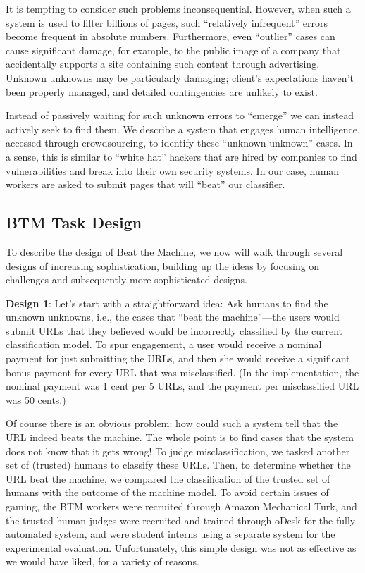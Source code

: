 
It is tempting to consider such problems inconsequential. However, when such a system is used to filter billions of pages, such ``relatively infrequent'' errors become frequent in absolute numbers. Furthermore, even ``outlier'' cases can cause significant damage, for example, to the public image of a company that accidentally supports a site containing such content through advertising. Unknown unknowns may be particularly damaging; client's expectations haven't been properly managed, and detailed contingencies are unlikely to exist. 

Instead of passively waiting for such unknown errors to ``emerge'' we can instead actively seek to find them. We describe a system that engages human intelligence, accessed through crowdsourcing, to identify these ``unknown unknown'' cases. In a sense, this is similar to ``white hat'' hackers that are hired by companies to find vulnerabilities and break into their own security systems. In our case, human workers are asked to submit pages that will ``beat'' our classifier.

\subsection{BTM Task Design}

To describe the design of Beat the Machine, we now will walk through several designs of increasing sophistication, building up the ideas by focusing on challenges and subsequently more sophisticated designs.

\textbf{Design 1}: Let's start with a straightforward idea: Ask humans to find the unknown unknowns, i.e., the cases that ``beat the machine''---the users would submit URLs that they believed would be incorrectly classified by the current classification model.  To spur engagement, a user would receive a nominal payment for just submitting the URLs, and then she would receive a significant bonus payment for every URL that was misclassified. (In the implementation, the nominal payment was 1 cent per 5 URLs, and the payment per misclassified URL was 50 cents.)  

Of course there is an obvious problem: how could such a system tell that the URL indeed beats the machine.  The whole point is to find cases that the system does not know that it gets wrong!   To judge misclassification, we tasked another set of (trusted) humans to classify these URLs.  Then, to determine whether the URL beat the machine, we compared the classification of the trusted set of humans with the outcome of the machine model. To avoid certain issues of gaming, the BTM workers were recruited through Amazon Mechanical Turk, and the trusted human judges were recruited and trained through oDesk for the fully automated system, and were student interns using a separate system for the experimental evaluation.  Unfortunately, this simple design was not as effective as we would have liked, for a variety of reasons.


